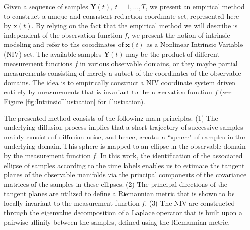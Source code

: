 \documentclass[aip,jcp,preprint]{revtex4-1}
\begin{document}
Given a sequence of samples $\mathbf{Y}(t), \ t=1,\ldots,T$, we present an empirical method to construct a unique and consistent reduction coordinate set, represented here by $\mathbf{x}(t)$.
%
By relying on the fact that the empirical method we will describe is independent of the observation function $f$, we present the notion of intrinsic modeling and refer to the coordinates of $\mathbf{x}(t)$ as a Nonlinear Intrinsic Variable (NIV) set.
%
The available samples $\mathbf{Y}(t)$ may be the product of different measurement functions $f$ in various observable domains, or they maybe partial measurements consisting of merely a subset of the coordinates of the observable domains.
%
The idea is to empirically construct a NIV coordinate system driven entirely by measurements that is invariant to the observation function $f$ (see Figure \ref{fig:IntrinsicIllustration} for illustration).

The presented method consists of the following main principles.
%
(1) The underlying diffusion process implies that a short trajectory of successive samples mainly consists of diffusion noise, and hence, creates a ``sphere" of samples in the underlying domain.
%
This sphere is mapped to an ellipse in the observable domain by the measurement function $f$.
%
In this work, the identification of the associated ellipse of samples according to the time labels enables us
to estimate the tangent planes of the observable manifolds via the principal components of the covariance matrices of the samples in these ellipses.
%
(2) The principal directions of the tangent planes are utilized to define a Riemannian metric that is shown to be locally invariant to the measurement function $f$.
%
(3) The NIV are constructed through the eigenvalue decomposition of a Laplace operator that is built upon a pairwise affinity between the samples, defined using the Riemannian metric.
\end{document}
